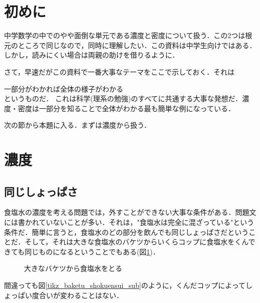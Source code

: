 \documentclass[dvipdfmx]{jsarticle}
\begin{document}
    \section*{初めに}
    中学数学の中でのやや面倒な単元である濃度と密度について扱う．この2つは根元のところで同じなので，同時に理解したい．この資料は中学生向けではある．しかし，読みにくい場合は両親の助けを借りるように．

    さて，早速だがこの資料で一番大事なテーマをここで示しておく．それは

    {\centering 一部分がわかれば全体の様子がわかる\\}
    というものだ．
    これは科学(理系の勉強)のすべてに共通する大事な発想だ．濃度・密度は一部分を知ることで全体がわかる最も簡単な例になっている．


    次の節から本題に入る．まずは濃度から扱う．

    \section{濃度}
    \subsection{同じしょっぱさ}
    食塩水の濃度を考える問題では，外すことができない大事な条件がある．問題文には書かれていないことが多い．それは，"食塩水は完全に混ざっている"という条件だ．簡単に言うと，食塩水のどの部分を飲んでも同じしょっぱさだということだ．そして，それは大きな食塩水のバケツからいくらコップに食塩水をくんできても同じものになるということでもある(図\ref{tikz_baketu_shokuensui})．

    \begin{figure}[htbp]\centering
        \caption{大きなバケツから食塩水をとる}
        \label{tikz_baketu_shokuensui}
    \end{figure}

    間違っても図\ref{tikz_baketu_shokuensui_sub}のように，くんだコップによってしょっぱい度合いが変わることはない．
\end{document}
